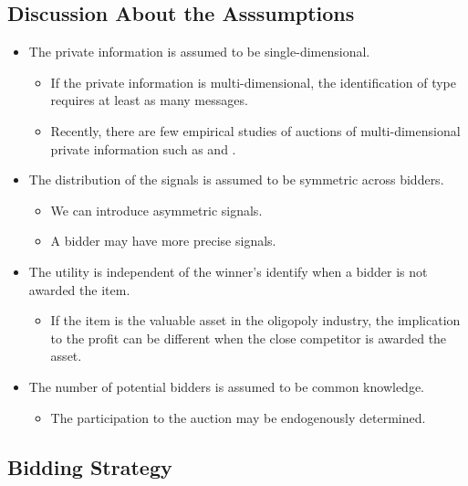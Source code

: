 \documentclass[]{book}
\providecommand{\tightlist}{%
  \setlength{\itemsep}{0pt}\setlength{\parskip}{0pt}}
\begin{document}
\subsection{Discussion About the
Asssumptions}\label{discussion-about-the-asssumptions}

\begin{itemize}
\tightlist
\item
  The private information is assumed to be single-dimensional.

  \begin{itemize}
  \tightlist
  \item
    If the private information is multi-dimensional, the identification
    of type requires at least as many messages.
  \item
    Recently, there are few empirical studies of auctions of
    multi-dimensional private information such as
    \citet{bajariBiddingIncompleteContracts2014} and
    \citet{takahashiStrategicDesignUncertain2018}.
  \end{itemize}
\item
  The distribution of the signals is assumed to be symmetric across
  bidders.

  \begin{itemize}
  \tightlist
  \item
    We can introduce asymmetric signals.
  \item
    A bidder may have more precise signals.
  \end{itemize}
\item
  The utility is independent of the winner's identify when a bidder is
  not awarded the item.

  \begin{itemize}
  \tightlist
  \item
    If the item is the valuable asset in the oligopoly industry, the
    implication to the profit can be different when the close competitor
    is awarded the asset.
  \end{itemize}
\item
  The number of potential bidders is assumed to be common knowledge.

  \begin{itemize}
  \tightlist
  \item
    The participation to the auction may be endogenously determined.
  \end{itemize}
\end{itemize}

\subsection{Bidding Strategy}\label{bidding-strategy}
\end{document}
